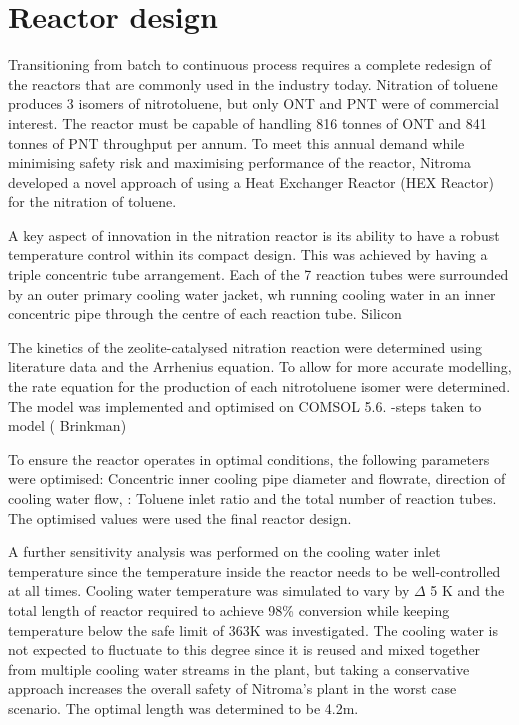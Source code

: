 \section*{Reactor design}
Transitioning from batch to continuous process requires a complete redesign of the reactors that are commonly used in the industry today. Nitration of toluene produces 3 isomers of nitrotoluene, but only ONT and PNT were of commercial interest. The reactor must be capable of handling 816 tonnes of ONT and 841 tonnes of PNT throughput per annum. To meet this annual demand while minimising safety risk and maximising performance of the reactor, Nitroma developed a novel approach of using a Heat Exchanger Reactor (HEX Reactor) for the nitration of toluene.

A key aspect of innovation in the nitration reactor is its ability to have a robust temperature control within its compact design. This was achieved by having a triple concentric tube arrangement. Each of the 7 reaction tubes were surrounded by an outer primary cooling water jacket, wh running cooling water in an inner concentric pipe through the centre of each reaction tube. 
Silicon 

The kinetics of the zeolite-catalysed nitration reaction were determined using literature data and the Arrhenius equation. To allow for more accurate modelling, the rate equation for the production of each nitrotoluene isomer were determined. 
The model was implemented and optimised on COMSOL 5.6. 
-steps taken to model ( Brinkman) 

To ensure the reactor operates in optimal conditions, the following parameters were optimised: Concentric inner cooling pipe diameter and flowrate, direction of cooling water flow,  : Toluene inlet ratio and the total number of reaction tubes. The optimised values were used the final reactor design.

A further sensitivity analysis was performed on the cooling water inlet temperature since the temperature inside the reactor needs to be well-controlled at all times. Cooling water temperature was simulated to vary by \mypm $\Delta$ 5 K and the total length of reactor required to achieve 98\% conversion while keeping temperature below the safe limit of 363K was investigated. The cooling water is not expected to fluctuate to this degree since it is reused and mixed together from multiple cooling water streams in the plant, but taking a conservative approach increases the overall safety of Nitroma's plant in the worst case scenario. The optimal length was determined to be 4.2m. 


